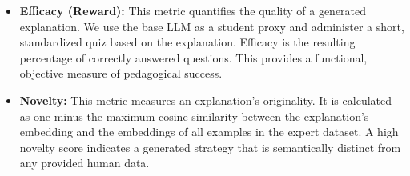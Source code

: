 \begin{itemize}
    \item \textbf{Efficacy (Reward):} This metric quantifies the quality of a generated explanation. We use the base LLM as a student proxy and administer a short, standardized quiz based on the explanation. Efficacy is the resulting percentage of correctly answered questions. This provides a functional, objective measure of pedagogical success.
    \item \textbf{Novelty:} This metric measures an explanation's originality. It is calculated as one minus the maximum cosine similarity between the explanation's embedding and the embeddings of all examples in the expert dataset. A high novelty score indicates a generated strategy that is semantically distinct from any provided human data.
\end{itemize}